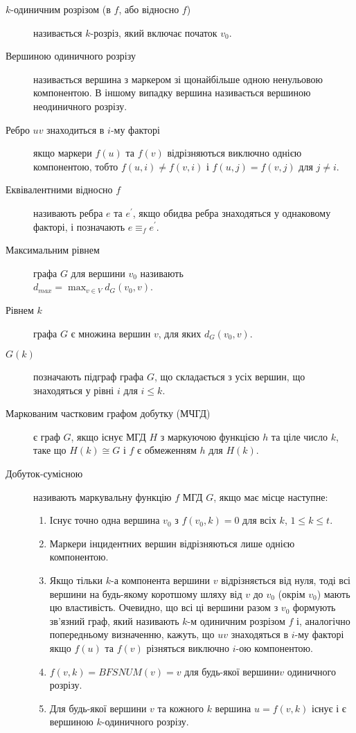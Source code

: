 \begin{description}
\item[$k$-одиничним розрізом (в $f$, або відносно $f$)] називається $k$-розріз, який включає початок $v_0$.
\item[Вершиною одиничного розрізу] називається вершина з маркером зі щонайбільше одною ненульовою компонентою. В іншому випадку вершина називається вершиною неодиничного розрізу.
\item[Ребро $uv$ знаходиться в $i$-му факторі] якщо маркери $f(u)$ та $f(v)$ відрізняються виключно однією компонентою, тобто $f(u,i) \ne f(v,i)$ і $f(u,j) = f(v,j)$ для $j \ne i$.
\item[Еквівалентними відносно $f$] називають ребра $e$ та $e^\prime$, якщо обидва ребра знаходяться у однаковому факторі, і позначають $e \equiv_f e^\prime$.
\item[Максимальним рівнем] графа $G$ для вершини $v_0$ називають\\$d_{max}=\max_{v \in V}d_G(v_0,v)$.
\item[Рівнем $k$] графа $G$ є множина вершин $v$, для яких $d_G(v_0,v)$.
\item[$G(k)$] позначають підграф графа $G$, що складається з усіх вершин, що знаходяться у рівні $i$ для $i \le k$.
\item[Маркованим частковим графом добутку (МЧГД)] є граф $G$, якщо існує МГД $H$ з маркуючою функцією $h$ та ціле число $k$, таке що $H(k) \cong G$ і $f$ є обмеженням $h$ для $H(k)$.
\item[Добуток-сумісною] називають маркувальну функцію $f$ МГД $G$, якщо має місце наступне:
  \begin{enumerate}
    \item Існує точно одна вершина $v_0$ з $f(v_0,k)=0$ для всіх $k$, $1 \le k \le t$.
    \item Маркери інцидентних вершин відрізняються лише однією компонентою.
    \item Якщо тільки $k$-а компонента вершини $v$ відрізняється від нуля, тоді всі вершини на будь-якому коротшому шляху від $v$ до $v_0$ (окрім $v_0$) мають цю властивість.
Очевидно, що всі ці вершини разом з $v_0$ формують зв'язний граф, який називають $k$-м одиничним розрізом $f$ і, аналогічно попередньому визначенню, кажуть, що $uv$ знаходяться в $i$-му факторі якщо $f(u)$ та $f(v)$ різняться виключно $i$-ою компонентою.
    \item $f(v,k)=BFSNUM(v)=v$ для будь-якої вершини$v$ одиничного розрізу.
    \item Для будь-якої вершини $v$ та кожного $k$ вершина $u=f(v,k)$ існує і є вершиною $k$-одиничного розрізу.

\end{enumerate}
\end{description}
